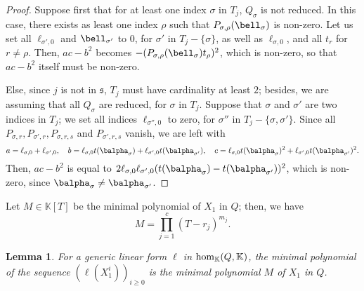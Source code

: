 \documentclass[12pt]{article}
\def\K {\ensuremath{\mathbb{K}}}
\newtheorem{Lemma}{Lemma}
\begin{document}
\begin{proof}
Suppose first that for at least one index $\sigma$ in $T_j$,
$Q_\sigma$ is not reduced. In this case, there exists as least one 
index $\rho$ such that
$P_{\sigma,\rho}(\bell_\sigma)$ is non-zero. Let us set all $\ell_{\sigma',0}$
and $\bell_{\sigma'}$ to $0$, for $\sigma'$ in $T_j-\{\sigma\}$, as well
as $\ell_{\sigma,0}$, and all $t_r$ for $r\ne \rho$. Then,
$ac-b^2$ becomes $-(P_{\sigma,\rho}(\bell_\sigma)t_\rho)^2$, which is 
non-zero, so that $ac-b^2$ itself must be non-zero.

Else, since $j$ is not in $\mathfrak{s}$, $T_j$ must have cardinality
at least $2$; besides, we are assuming that all $Q_\sigma$ are
reduced, for $\sigma$ in $T_j$.  Suppose that $\sigma$ and $\sigma'$
are two indices in $T_j$; we set all indices $\ell_{\sigma'',0}$ to
zero, for $\sigma''$ in $T_j-\{\sigma,\sigma'\}$. Since
all $P_{\sigma,r},P_{\sigma',r},P_{\sigma,r,s}$ and $P_{\sigma',r,s}$
vanish, we are left with
$$
a=\ell_{\sigma,0}+\ell_{\sigma',0},\quad
b=\ell_{\sigma,0}t(\balpha_{\sigma})+\ell_{\sigma',0}t(\balpha_{\sigma'}),\quad
c=\ell_{\sigma,0}t(\balpha_{\sigma})^2+\ell_{\sigma',0}t(\balpha_{\sigma'})^2.
$$
Then, $ac-b^2$ is equal to $2\ell_{\sigma,0}\ell_{\sigma',0}(t(\balpha_{\sigma})-t(\balpha_{\sigma'}))^2$,
which is non-zero, since $\balpha_\sigma \ne \balpha_{\sigma'}$.
\end{proof}










Let $M \in \K[T]$ be the minimal polynomial of $X_1$ in $Q$; then, we have
$$M=\prod_{j=1}^c (T-r_j)^{m_j}.$$
\begin{Lemma}
  For a generic linear form $\ell$ in ${\rm hom}_\K(Q,\K)$, the minimal
  polynomial of the sequence $(\ell(X_1^i))_{i \ge 0}$ is the minimal
  polynomial $M$ of $X_1$ in $Q$.
\end{Lemma}
\end{document}
